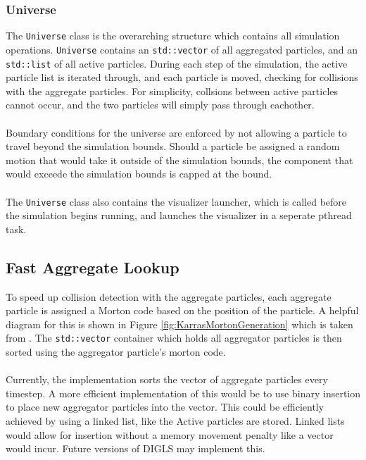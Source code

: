 \documentclass[fleqn,10pt]{UserGuideArx} %
\begin{document}
\subsubsection{Universe}
The \texttt{Universe} class is the overarching structure which contains all simulation operations. \texttt{Universe} contains an \texttt{std\allowbreak::vector} of all aggregated particles, and an \texttt{std\allowbreak::list} of all active particles. During each step of the simulation, the active particle list is iterated through, and each particle is moved, checking for collisions with the aggregate particles. For simplicity, collsions between active particles cannot occur, and the two particles will simply pass through eachother. \\~\\
Boundary conditions for the universe are enforced by not allowing a particle to travel beyond the simulation bounds. Should a particle be assigned a random motion that would take it outside of the simulation bounds, the component that would exceede the simulation bounds is capped at the bound. \\~\\
The \texttt{Universe} class also contains the visualizer launcher, which is called before the simulation begins running, and launches the visualizer in a seperate pthread task.\\

\subsection{Fast Aggregate Lookup}
To speed up collision detection with the aggregate particles, each aggregate particle is assigned a Morton code based on the position of the particle. A helpful diagram for this is shown in Figure \ref{fig:KarrasMortonGeneration} which is taken from \cite{Karras:2012}. The \texttt{std\allowbreak::vector} container which holds all aggregator particles is then sorted using the aggregator particle's morton code. \\~\\
Currently, the implementation sorts the vector of aggregate particles every timestep. A more efficient implementation of this would be to use binary insertion to place new aggregator particles into the vector. This could be efficiently achieved by using a linked list, like the Active particles are stored. Linked lists would allow for insertion without a memory movement penalty like a vector would incur. Future versions of DIGLS may implement this.\\
\end{document}
